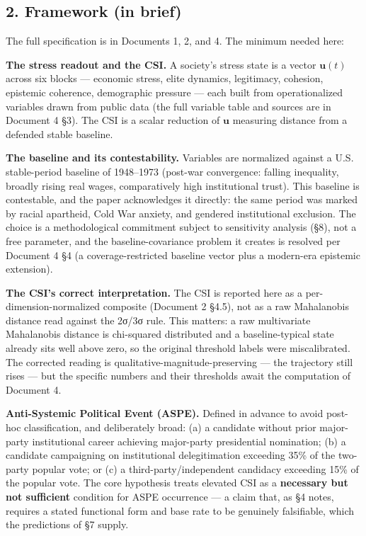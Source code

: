 \documentclass[
]{article}
\begin{document}
\subsection{2. Framework (in brief)}\label{framework-in-brief}

The full specification is in Documents 1, 2, and 4. The minimum needed
here:

\textbf{The stress readout and the CSI.} A society's stress state is a
vector \(\mathbf{u}(t)\) across six blocks --- economic stress, elite
dynamics, legitimacy, cohesion, epistemic coherence, demographic
pressure --- each built from operationalized variables drawn from public
data (the full variable table and sources are in Document 4 §3). The CSI
is a scalar reduction of \(\mathbf{u}\) measuring distance from a
defended stable baseline.

\textbf{The baseline and its contestability.} Variables are normalized
against a U.S. stable-period baseline of 1948--1973 (post-war
convergence: falling inequality, broadly rising real wages,
comparatively high institutional trust). This baseline is contestable,
and the paper acknowledges it directly: the same period was marked by
racial apartheid, Cold War anxiety, and gendered institutional
exclusion. The choice is a methodological commitment subject to
sensitivity analysis (§8), not a free parameter, and the
baseline-covariance problem it creates is resolved per Document 4 §4 (a
coverage-restricted baseline vector plus a modern-era epistemic
extension).

\textbf{The CSI's correct interpretation.} The CSI is reported here as a
per-dimension-normalized composite (Document 2 §4.5), not as a raw
Mahalanobis distance read against the 2σ/3σ rule. This matters: a raw
multivariate Mahalanobis distance is chi-squared distributed and a
baseline-typical state already sits well above zero, so the original
threshold labels were miscalibrated. The corrected reading is
qualitative-magnitude-preserving --- the trajectory still rises --- but
the specific numbers and their thresholds await the computation of
Document 4.

\textbf{Anti-Systemic Political Event (ASPE).} Defined in advance to
avoid post-hoc classification, and deliberately broad: (a) a candidate
without prior major-party institutional career achieving major-party
presidential nomination; (b) a candidate campaigning on institutional
delegitimation exceeding 35\% of the two-party popular vote; or (c) a
third-party/independent candidacy exceeding 15\% of the popular vote.
The core hypothesis treats elevated CSI as a \textbf{necessary but not
sufficient} condition for ASPE occurrence --- a claim that, as §4 notes,
requires a stated functional form and base rate to be genuinely
falsifiable, which the predictions of §7 supply.
\end{document}
